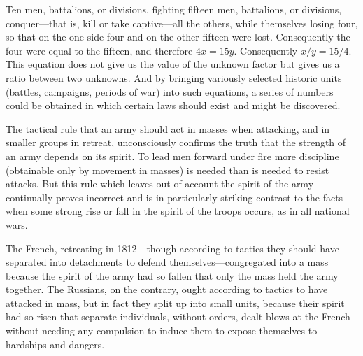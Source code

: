 Ten men, battalions, or divisions, fighting fifteen men,
battalions, or divisions, conquer---that is, kill or take
captive---all the others, while themselves losing four, so that
on the one side four and on the other fifteen were
lost. Consequently the four were equal to the fifteen, and
therefore $4x = 15y$. Consequently $x/y = 15/4$. This equation
does not give us the value of the unknown factor but gives us a
ratio between two unknowns. And by bringing variously selected
historic units (battles, campaigns, periods of war) into such
equations, a series of numbers could be obtained in which certain
laws should exist and might be discovered.

The tactical rule that an army should act in masses when
attacking, and in smaller groups in retreat, unconsciously
confirms the truth that the strength of an army depends on its
spirit. To lead men forward under fire more discipline
(obtainable only by movement in masses) is needed than is needed
to resist attacks. But this rule which leaves out of account the
spirit of the army continually proves incorrect and is in
particularly striking contrast to the facts when some strong rise
or fall in the spirit of the troops occurs, as in all national
wars.

The French, retreating in 1812---though according to tactics they
should have separated into detachments to defend
themselves---cong\-re\-ga\-ted into a mass because the spirit of the
army had so fallen that only the mass held the army together. The
Russians, on the contrary, ought according to tactics to have
attacked in mass, but in fact they split up into small units,
because their spirit had so risen that separate individuals,
without orders, dealt blows at the French without needing any
compulsion to induce them to expose themselves to hardships and
dangers.


